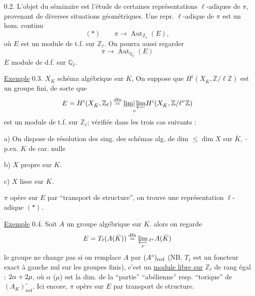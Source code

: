0.2. L'objet du séminaire est l'étude de certaines représentations $\ell$-adiques de $\pi$, provenant de diverses situations géométriques. Une repr. $\ell$-adique de $\pi$ est un  hom. continu
\[
(*)\qquad\pi\longrightarrow\operatorname{Aut}_{\mathbb Z_\ell}(E),
\]
où $E$ est un module de t.f. sur $\mathbb Z_\ell$. On pourra aussi regarder
\[
\pi\longrightarrow\operatorname{Aut}_{\mathbb Q_\ell}(E)
\]
$E$ module de d.f. sur $\mathbb Q_\ell$.

\uline{Exemple} 0.3. $X_K$ schéma algébrique sur $K$,  On suppose que $H^i(X_{\bar K},\mathbb Z/\ell\mathbb Z)$ est un groupe fini, de sorte que
\[
E=H^i(X_{\bar K},\mathbb Z_\ell)\overset{\mathrm{dfn}}=\underset{\nu}{{\underline{\lim}|\varprojlim}}H^i(X_{\bar K},\mathbb Z/\ell^\nu\mathbb Z)
\]
est un module de t.f. sur $\mathbb Z_\ell$;   vérifiée dans les trois cas suivants :

a) On dispose de résolution des sing.  des schémas alg. de dim $\leq\dim X$ sur $\bar K$, -- p.ex. $K$ de car. nulle

b) $X$ propre sur $K$.

c) $X$ lisse sur $K$.

 $\pi$ opère sur  $E$ par ``transport de structure'', on trouve une représentation $\ell$-adique $(*)$.

\uline{Exemple} 0.4. Soit $A$ un  groupe algébrique  sur $K$.
 alors on regarde
\[
 E=T_\ell(A(\bar K))\overset{\mathrm{dfn}}=\varprojlim_\nu {}_{\ell^\nu}A(\bar K)
\]
 le groupe ne change pas si on remplace $A$ par $(A^\circ)_{{\mathrm{red}}}$ (NB. $T_\ell$ est un foncteur exact à gauche nul sur les groupes finis), c'est un  \uline{module libre sur} $\mathbb Z_\ell$ de rang égal : $2\alpha+{{2}}\mu$, où $\alpha$ ($\mu$) est la dim. de la ``partie'' ``abélienne'' resp.  ``torique'' de $(A_K)^\circ_{\mathrm{red}}$. Ici encore, $\pi$ opère sur $E$ par transport de structure.

